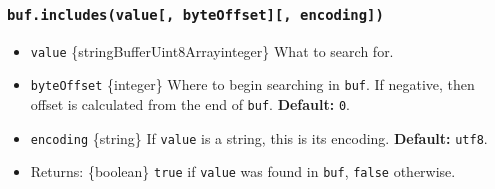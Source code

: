 \begin{Shaded}
\begin{Highlighting}[]
\NormalTok{ \{ }\NormalTok{ \} }\OperatorTok{=} \NormalTok{(}\NormalTok{)}\OperatorTok{;}

\OperatorTok{=} \NormalTok{(}\NormalTok{)}\OperatorTok{;}

\NormalTok{(}\NormalTok{))}\OperatorTok{;}
\NormalTok{(}\OperatorTok{,} \NormalTok{))}\OperatorTok{;}
\NormalTok{(}\OperatorTok{,} \NormalTok{))}\OperatorTok{;}
\end{Highlighting}
\end{Shaded}

\subsubsection{\texorpdfstring{\texttt{buf.includes(value{[},\ byteOffset{]}{[},\ encoding{]})}}{buf.includes(value{[}, byteOffset{]}{[}, encoding{]})}}\label{buf.includesvalue-byteoffset-encoding}

\begin{itemize}
\tightlist
\item
  \texttt{value}
  \{string\textbar Buffer\textbar Uint8Array\textbar integer\} What to
  search for.
\item
  \texttt{byteOffset} \{integer\} Where to begin searching in
  \texttt{buf}. If negative, then offset is calculated from the end of
  \texttt{buf}. \textbf{Default:} \texttt{0}.
\item
  \texttt{encoding} \{string\} If \texttt{value} is a string, this is
  its encoding. \textbf{Default:}
  \texttt{\textquotesingle{}utf8\textquotesingle{}}.
\item
  Returns: \{boolean\} \texttt{true} if \texttt{value} was found in
  \texttt{buf}, \texttt{false} otherwise.
\end{itemize}

